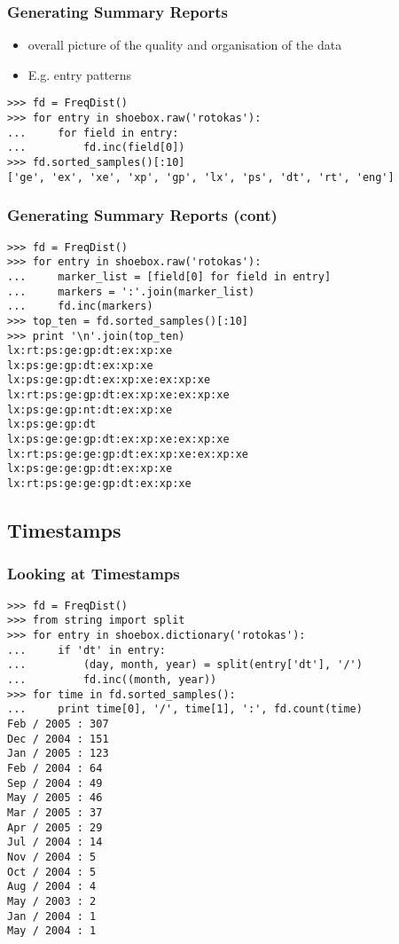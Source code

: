 \documentclass{beamer}
\begin{document}
\begin{frame}[fragile]
\frametitle{Generating Summary Reports}
\begin{itemize}
\item overall picture of the quality and organisation of the data
\item E.g. entry patterns
\end{itemize}

\begin{verbatim}
>>> fd = FreqDist()
>>> for entry in shoebox.raw('rotokas'):
...     for field in entry:
...	        fd.inc(field[0])
>>> fd.sorted_samples()[:10]
['ge', 'ex', 'xe', 'xp', 'gp', 'lx', 'ps', 'dt', 'rt', 'eng']
\end{verbatim}
\end{frame}

\begin{frame}[fragile]
\frametitle{Generating Summary Reports (cont)}

\begin{verbatim}
>>> fd = FreqDist()
>>> for entry in shoebox.raw('rotokas'):
...     marker_list = [field[0] for field in entry]
...     markers = ':'.join(marker_list)
...	    fd.inc(markers)
>>> top_ten = fd.sorted_samples()[:10]
>>> print '\n'.join(top_ten)
lx:rt:ps:ge:gp:dt:ex:xp:xe
lx:ps:ge:gp:dt:ex:xp:xe
lx:ps:ge:gp:dt:ex:xp:xe:ex:xp:xe
lx:rt:ps:ge:gp:dt:ex:xp:xe:ex:xp:xe
lx:ps:ge:gp:nt:dt:ex:xp:xe
lx:ps:ge:gp:dt
lx:ps:ge:ge:gp:dt:ex:xp:xe:ex:xp:xe
lx:rt:ps:ge:ge:gp:dt:ex:xp:xe:ex:xp:xe
lx:ps:ge:ge:gp:dt:ex:xp:xe
lx:rt:ps:ge:ge:gp:dt:ex:xp:xe
\end{verbatim}
\end{frame}

\subsection{Timestamps}

\begin{frame}[fragile]
\frametitle{Looking at Timestamps}
\small
\begin{verbatim}
>>> fd = FreqDist()
>>> from string import split
>>> for entry in shoebox.dictionary('rotokas'):
...     if 'dt' in entry:
...         (day, month, year) = split(entry['dt'], '/')
...         fd.inc((month, year))
>>> for time in fd.sorted_samples():
...     print time[0], '/', time[1], ':', fd.count(time)
Feb / 2005 : 307
Dec / 2004 : 151
Jan / 2005 : 123
Feb / 2004 : 64
Sep / 2004 : 49
May / 2005 : 46
Mar / 2005 : 37
Apr / 2005 : 29
Jul / 2004 : 14
Nov / 2004 : 5
Oct / 2004 : 5
Aug / 2004 : 4
May / 2003 : 2
Jan / 2004 : 1
May / 2004 : 1
\end{verbatim}
\end{frame}
\end{document}
